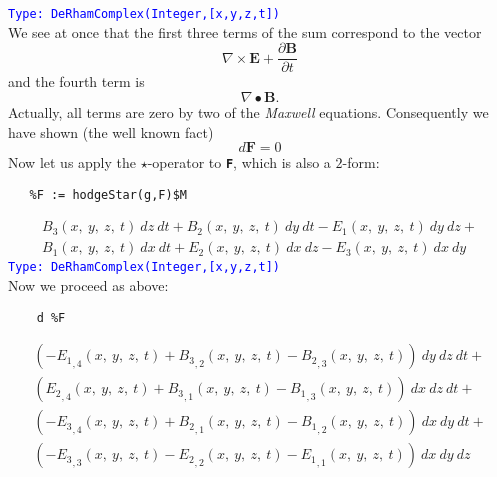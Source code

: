 \documentclass[12pt,a4paper]{article}
\newcommand{\spadbold}[1]{{\tt\bf #1}}
\newcommand{\type}[1]{\textcolor{blue}{\tt\tiny #1}}
\begin{document}
\type{Type: DeRhamComplex(Integer,[x,y,z,t])}
\\
We see at once that the first three terms of the sum correspond to the
vector
\begin{displaymath}
   \nabla\times\mathbf{E}+\frac{\partial\mathbf{B}}{\partial t}
\end{displaymath}
and the fourth term is
\begin{displaymath}
 \nabla\bullet\mathbf{B}.
\end{displaymath}
Actually, all terms are zero by two of the {\it Maxwell} equations. 
Consequently we have shown (the well known fact)
\begin{displaymath}
   d\mathbf{F} = 0
\end{displaymath}
Now let us apply the $\star$-operator to \spadbold{F}, which is also a 
$2$-form:
\begin{lstlisting}
   %F := hodgeStar(g,F)$M
\end{lstlisting}
\begin{eqnarray*}
    {{{B _ {3}}\left({x, \: y, \: z, \: t}\right)}
    \  dz \  dt} + {{{B _ {2}} \left({x, \: y, \: z, \: t}
    \right)}\  dy \  dt} -{{{E _ {1}}\left({x, \: y, \: z, \: t}
    \right)}\  dy \  dz}+ \\ 
    {{{B _ {1}}\left({x, \: y, \: z, \: t}\right)}
    \  dx \  dt} + {{{E _ {2}}\left({x, \: y, \: z, \: t}
    \right)}\  dx \  dz}- {{{E _ {3}}\left({x, \: y, \: z, \: t}
    \right)}\  dx \  dy}
\end{eqnarray*}
\type{Type: DeRhamComplex(Integer,[x,y,z,t])}
\\
Now we proceed as above:
\begin{lstlisting}
    d %F
\end{lstlisting}
\begin{eqnarray*}
    {{\left( -{{{E _ {1}} _ {{,4}}}\left({x, \: y, \: z, \: t}
    \right)}+{{{B_ {3}} _ {{,2}}}\left({x, \: y, \: z, \: t}\right)}
    -{{{B _ {2}} _ {{,3}}}\left({x, \: y, \: z, \: t}\right)}
    \right)}\  dy \  dz \  dt}+ \\ 
    {{\left( {{{E _ {2}} _ {{,4}}}\left({x, \: y, \: z, \: t}
    \right)}+{{{B_ {3}} _ {{,1}}}\left({x, \: y, \: z, \: t}\right)}
    -{{{B _ {1}} _ {{,3}}}\left({x, \: y, \: z, \: t}\right)}
    \right)}\  dx \  dz \  dt}+ \\ 
    {{\left( -{{{E _ {3}} _ {{,4}}}
    \left( {x, \: y, \: z, \: t}\right)}+{{{B_ {2}} _ {{,1}}}
    \left({x, \: y, \: z, \: t}\right)}-{{{B _ {1}} _ {{,2}}}
    \left({x, \: y, \: z, \: t}\right)}\right)}\  dx \  dy \  dt}+ \\ 
    {{\left( -{{{E _ {3}} _ {{,3}}}\left({x, \: y, \: z, \: t}
    \right)}-{{{E _ {2}} _ {{,2}}}\left({x, \: y, \: z, \: t}
    \right)}-{{{E _ {1}} _ {{,1}}}\left({x, \: y, \: z, \: t}
    \right)}\right)}\  dx \  dy \  dz}
\end{eqnarray*}
\end{document}
